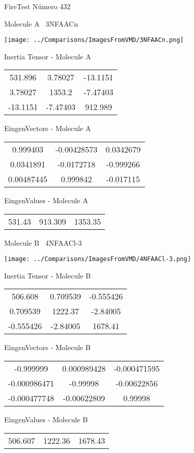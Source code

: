 \vtab[-3cm]
\begin{center}
{\large FireTest \tab Número 432}
\end{center}
\begin{multicols}{2}
\begin{center}

Molecule A \
3NFAACn

\texttt{[image: ../Comparisons/ImagesFromVMD/3NFAACn.png]}

Inertia Tensor - Molecule A \\
\begin{tabular}{|c c c|}
531.896	 & 	3.78027	 & 	-13.1151	 \\
3.78027	 & 	1353.2	 & 	-7.47403	 \\
-13.1151	 & 	-7.47403	 & 	912.989
\end{tabular}

\vtab
 EingenVectors - Molecule A     \\
\begin{tabular}{|c c c|}
0.999403	 & 	-0.00428573	 & 	0.0342679	 \\
0.0341891	 & 	-0.0172718	 & 	-0.999266	 \\
0.00487445	 & 	0.999842	 & 	-0.017115
\end{tabular}

\vtab
 EingenValues - Molecule A     \\
\begin{tabular}{|c c c|}
531.43	 & 	913.309	 & 	1353.35	 \\
\end{tabular}
\columnbreak

Molecule B \
4NFAACl-3

\texttt{[image: ../Comparisons/ImagesFromVMD/4NFAACl-3.png]}

Inertia Tensor - Molecule B \\
\begin{tabular}{|c c c|}
506.608	 & 	0.709539	 & 	-0.555426	 \\
0.709539	 & 	1222.37	 & 	-2.84005	 \\
-0.555426	 & 	-2.84005	 & 	1678.41
\end{tabular}

\vtab
 EingenVectors - Molecule B     \\
\begin{tabular}{|c c c|}
-0.999999	 & 	0.000989428	 & 	-0.000471595	 \\
-0.000986471	 & 	-0.99998	 & 	-0.00622856	 \\
-0.000477748	 & 	-0.00622809	 & 	0.99998
\end{tabular}

\vtab
 EingenValues - Molecule B     \\
\begin{tabular}{|c c c|}
506.607	 & 	1222.36	 & 	1678.43	 \\
\end{tabular}

\end{center}
\end{multicols}


